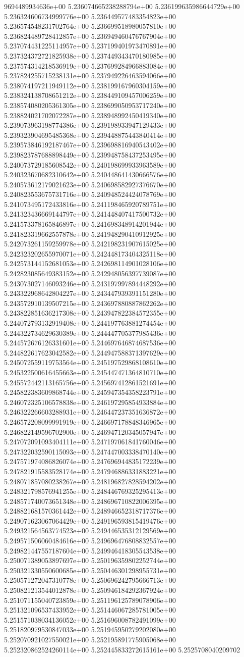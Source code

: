 9694489934636e+00	5.236074665238288794e+00	5.236199635986644729e+00	5.236324606734999776e+00	5.236449577483354823e+00	5.236574548231702764e+00	5.236699518980057810e+00	5.236824489728412857e+00	5.236949460476767904e+00	5.237074431225114957e+00	5.237199401973470891e+00	5.237324372721825938e+00	5.237449343470180985e+00	5.237574314218536919e+00	5.237699284966883084e+00	5.237824255715238131e+00	5.237949226463594066e+00	5.238074197211949112e+00	5.238199167960304159e+00	5.238324138708651212e+00	5.238449109457006259e+00	5.238574080205361305e+00	5.238699050953717240e+00	5.238824021702072287e+00	5.238948992450419340e+00	5.239073963198774386e+00	5.239198933947129433e+00	5.239323904695485368e+00	5.239448875443840414e+00	5.239573846192187467e+00	5.239698816940543402e+00	5.239823787688898449e+00	5.239948758437253495e+00	5.240073729185608542e+00	5.240198699933963589e+00	5.240323670682310642e+00	5.240448641430666576e+00	5.240573612179021623e+00	5.240698582927376670e+00	5.240823553675731716e+00	5.240948524424078769e+00	5.241073495172433816e+00	5.241198465920789751e+00	5.241323436669144797e+00	5.241448407417500732e+00	5.241573378165846897e+00	5.241698348914201944e+00	5.241823319662557878e+00	5.241948290410912925e+00	5.242073261159259978e+00	5.242198231907615025e+00	5.242323202655970071e+00	5.242448173404325118e+00	5.242573144152681053e+00	5.242698114901028106e+00	5.242823085649383152e+00	5.242948056397739087e+00	5.243073027146093246e+00	5.243197997894448292e+00	5.243322968642804227e+00	5.243447939391151280e+00	5.243572910139507215e+00	5.243697880887862262e+00	5.243822851636217308e+00	5.243947822384572355e+00	5.244072793132919408e+00	5.244197763881274454e+00	5.244322734629630389e+00	5.244447705377985436e+00	5.244572676126331601e+00	5.244697646874687536e+00	5.244822617623042582e+00	5.244947588371397629e+00	5.245072559119753564e+00	5.245197529868108610e+00	5.245322500616455663e+00	5.245447471364810710e+00	5.245572442113165756e+00	5.245697412861521691e+00	5.245822383609868744e+00	5.245947354358223791e+00	5.246072325106578838e+00	5.246197295854933884e+00	5.246322266603288931e+00	5.246447237351636872e+00	5.246572208099991919e+00	5.246697178848346965e+00	5.246822149596702900e+00	5.246947120345057947e+00	5.247072091093404111e+00	5.247197061841760046e+00	5.247322032590115093e+00	5.247447003338470140e+00	5.247571974086826074e+00	5.247696944835172239e+00	5.247821915583528174e+00	5.247946886331883221e+00	5.248071857080238267e+00	5.248196827828594202e+00	5.248321798576941255e+00	5.248446769325295413e+00	5.248571740073651348e+00	5.248696710822006395e+00	5.248821681570361442e+00	5.248946652318717376e+00	5.249071623067064429e+00	5.249196593815419476e+00	5.249321564563774523e+00	5.249446535312129569e+00	5.249571506060484616e+00	5.249696476808832557e+00	5.249821447557187604e+00	5.249946418305543538e+00	5.250071389053897697e+00	5.250196359802252744e+00	5.250321330550600685e+00	5.250446301298955731e+00	5.250571272047310778e+00	5.250696242795666713e+00	5.250821213544012878e+00	5.250946184292367924e+00	5.251071155040723859e+00	5.251196125789078906e+00	5.251321096537433952e+00	5.251446067285781005e+00	5.251571038034136052e+00	5.251696008782491099e+00	5.251820979530847033e+00	5.251945950279202080e+00	5.252070921027550021e+00	5.252195891775905068e+00	5.252320862524260114e+00	5.252445833272615161e+00	5.2525708040209702